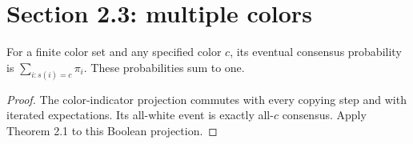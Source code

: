 \section{Section 2.3: multiple colors}
\begin{theorem}\label{thm:colors}
\leanok{}
For a finite color set and any specified color $c$, its eventual consensus
probability is $\sum_{i:s(i)=c}\pi_i$. These probabilities sum to one.
\end{theorem}
\begin{proof}\leanok
The color-indicator projection commutes with every copying step and with
iterated expectations. Its all-white event is exactly all-$c$ consensus.
Apply Theorem 2.1 to this Boolean projection.
\end{proof}

